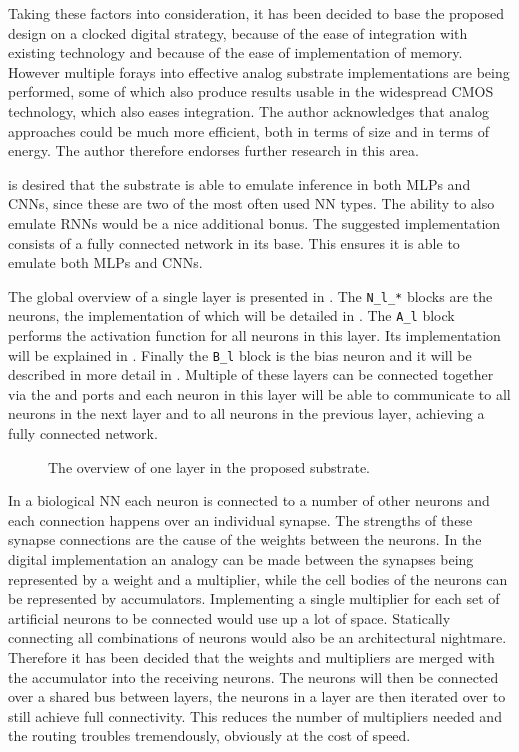 Taking these factors into consideration, it has been decided to base the proposed design on a clocked digital strategy, because of the ease of integration with existing technology and because of the ease of implementation of memory. However multiple forays into effective analog substrate implementations are being performed, some of which also produce results usable in the widespread \ac{CMOS} technology, which also eases integration\cite{239745,81862,machofnewsoul}. The author acknowledges that analog approaches could be much more efficient, both in terms of size and in terms of energy. The author therefore endorses further research in this area.

 is desired that the substrate is able to emulate inference in both \acp{MLP} and \acp{CNN}, since these are two of the most often used \ac{NN} types\cite{8192463}. The ability to also emulate \acp{RNN} would be a nice additional bonus. The suggested implementation consists of a fully connected network in its base. This ensures it is able to emulate both \acp{MLP} and \acp{CNN}.

The global overview of a single layer is presented in . The \texttt{N\_l\_*} blocks are the neurons, the implementation of which will be detailed in . The \texttt{A\_l} block performs the activation function for all neurons in this layer. Its implementation will be explained in . Finally the \texttt{B\_l} block is the bias neuron and it will be described in more detail in . Multiple of these layers can be connected together via the  and  ports and each neuron in this layer will be able to communicate to all neurons in the next layer and to all neurons in the previous layer, achieving a fully connected network.

\begin{figure*}[!ht]
  \centering
  
  \caption{The overview of one layer in the proposed substrate.}
  \label{fig:layer}
\end{figure*}

In a biological \ac{NN} each neuron is connected to a number of other neurons and each connection happens over an individual synapse. The strengths of these synapse connections are the cause of the weights between the neurons. In the digital implementation an analogy can be made between the synapses being represented by a weight and a multiplier, while the cell bodies of the neurons can be represented by accumulators. Implementing a single multiplier for each set of artificial neurons to be connected would use up a lot of space. Statically connecting all combinations of neurons would also be an architectural nightmare. Therefore it has been decided that the weights and multipliers are merged with the accumulator into the receiving neurons. The neurons will then be connected over a shared bus between layers, the neurons in a layer are then iterated over to still achieve full connectivity. This reduces the number of multipliers needed and the routing troubles tremendously, obviously at the cost of speed.

